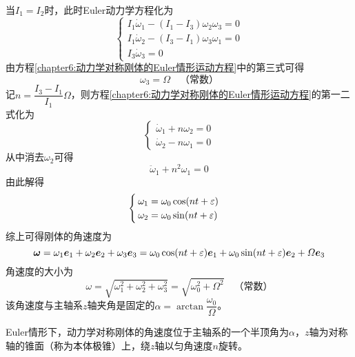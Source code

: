 当$I_1=I_2$时，此时Euler动力学方程化为
\begin{equation}
	\begin{cases}
		I_1 \dot{\omega}_1 - (I_1-I_3)\omega_2 \omega_3 = 0 \\
		I_1 \dot{\omega}_2 - (I_3-I_1)\omega_3 \omega_1 = 0 \\
		I_3 \dot{\omega}_3 = 0
	\end{cases}
	\label{chapter6:动力学对称刚体的Euler情形运动方程}
\end{equation}
由方程\eqref{chapter6:动力学对称刚体的Euler情形运动方程}中的第三式可得
\begin{equation}
	\omega_3 = \varOmega \quad \text{（常数）}
	\label{对称Euler陀螺的解-1}
\end{equation}
记$n = \dfrac{I_3-I_1}{I_1} \varOmega$，则方程\eqref{chapter6:动力学对称刚体的Euler情形运动方程}的第一二式化为
\begin{equation*}
	\begin{cases}
		\dot{\omega}_1 + n\omega_2 = 0 \\
		\dot{\omega}_2 - n\omega_1 = 0
	\end{cases}
\end{equation*}
从中消去$\omega_2$可得
\begin{equation*}
	\ddot{\omega}_1 + n^2\omega_1 = 0
\end{equation*}
由此解得
\begin{equation}
\begin{cases}
	\omega_1 = \omega_0 \cos(nt+\varepsilon) \\
	\omega_2 = \omega_0 \sin(nt+\varepsilon)
\end{cases}
\label{对称Euler陀螺的解-2}
\end{equation}
综上可得刚体的角速度为
\begin{equation}
	\boldsymbol{\omega} = \omega_1 \boldsymbol{e}_1 + \omega_2 \boldsymbol{e}_2 + \omega_3 \boldsymbol{e}_3 = \omega_0 \cos(nt+\varepsilon) \boldsymbol{e}_1 + \omega_0 \sin(nt+\varepsilon) \boldsymbol{e}_2 + \varOmega \boldsymbol{e}_3
	\label{对称Euler陀螺的解-3}
\end{equation}
角速度的大小为
\begin{equation*}
	\omega = \sqrt{\omega_1^2 +\omega_2^2 +\omega_3^2} = \sqrt{\omega_0^2 + \varOmega^2}\quad \text{（常数）}
\end{equation*}
该角速度与主轴系$z$轴夹角是固定的$\alpha = \arctan \dfrac{\omega_0}{\varOmega}$。

Euler情形下，动力学对称刚体的角速度位于主轴系的一个半顶角为$\alpha$，$z$轴为对称轴的锥面（称为{\heiti 本体极锥}）上，绕$z$轴以匀角速度$n$旋转。

